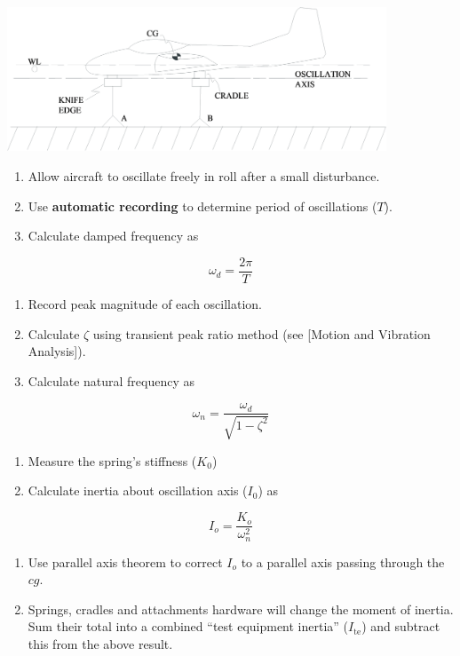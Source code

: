 \documentclass[
]{book}
\providecommand{\tightlist}{%
  \setlength{\itemsep}{0pt}\setlength{\parskip}{0pt}}
\begin{document}
\includegraphics[width=4.45278in,height=1.69375in]{media/07/image25.svg}~

\begin{enumerate}
\def\labelenumi{\arabic{enumi}.}
\setcounter{enumi}{2}
\tightlist
\item
  Allow aircraft to oscillate freely in roll after a small disturbance.
\item
  Use \textbf{automatic recording} to determine period of oscillations (\(T\)).
\item
  Calculate damped frequency as
\end{enumerate}

\[ \omega_d = \frac{2\pi}{T} \]

\begin{enumerate}
\def\labelenumi{\arabic{enumi}.}
\setcounter{enumi}{5}
\tightlist
\item
  Record peak magnitude of each oscillation.
\item
  Calculate \(\zeta\) using transient peak ratio method (see {[}Motion and Vibration Analysis{]}).
\item
  Calculate natural frequency as
\end{enumerate}

\[ \omega_n = \frac{\omega_d}{\sqrt{1 - \zeta^2}} \]

\begin{enumerate}
\def\labelenumi{\arabic{enumi}.}
\setcounter{enumi}{8}
\tightlist
\item
  Measure the spring's stiffness (\(K_0\))
\item
  Calculate inertia about oscillation axis (\(I_0\)) as
\end{enumerate}

\[ I_o = \frac{K_o}{\omega_n^2} \]

\begin{enumerate}
\def\labelenumi{\arabic{enumi}.}
\setcounter{enumi}{10}
\tightlist
\item
  Use parallel axis theorem to correct \(I_o\) to a parallel axis passing through the \(cg\).
\item
  Springs, cradles and attachments hardware will change the moment of inertia. Sum their total into a combined ``test equipment inertia'' (\Delta\(I_{\mathrm{te}}\)) and subtract this from the above result.
\end{enumerate}
\end{document}
